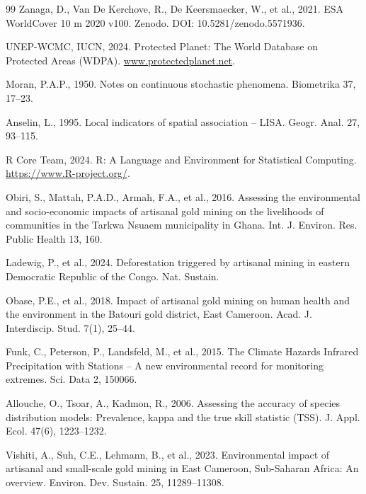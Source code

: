 \documentclass[preprint,12pt,authoryear]{elsarticle}
\begin{document}
\begin{thebibliography}{99}
Zanaga, D., Van De Kerchove, R., De Keersmaecker, W., et al., 2021. ESA WorldCover 10 m 2020 v100. Zenodo. DOI: 10.5281/zenodo.5571936.

UNEP-WCMC, IUCN, 2024. Protected Planet: The World Database on Protected Areas (WDPA). \url{www.protectedplanet.net}.

Moran, P.A.P., 1950. Notes on continuous stochastic phenomena. Biometrika 37, 17--23.

Anselin, L., 1995. Local indicators of spatial association -- LISA. Geogr. Anal. 27, 93--115.

R Core Team, 2024. R: A Language and Environment for Statistical Computing. \url{https://www.R-project.org/}.

Obiri, S., Mattah, P.A.D., Armah, F.A., et al., 2016. Assessing the environmental and socio-economic impacts of artisanal gold mining on the livelihoods of communities in the Tarkwa Nsuaem municipality in Ghana. Int. J. Environ. Res. Public Health 13, 160.

Ladewig, P., et al., 2024. Deforestation triggered by artisanal mining in eastern Democratic Republic of the Congo. Nat. Sustain.

Obase, P.E., et al., 2018. Impact of artisanal gold mining on human health and the environment in the Batouri gold district, East Cameroon. Acad. J. Interdiscip. Stud. 7(1), 25--44.

Funk, C., Peterson, P., Landsfeld, M., et al., 2015. The Climate Hazards Infrared Precipitation with Stations -- A new environmental record for monitoring extremes. Sci. Data 2, 150066.

Allouche, O., Tsoar, A., Kadmon, R., 2006. Assessing the accuracy of species distribution models: Prevalence, kappa and the true skill statistic (TSS). J. Appl. Ecol. 47(6), 1223--1232.

Vishiti, A., Suh, C.E., Lehmann, B., et al., 2023. Environmental impact of artisanal and small-scale gold mining in East Cameroon, Sub-Saharan Africa: An overview. Environ. Dev. Sustain. 25, 11289--11308.


\end{thebibliography}
\end{document}
